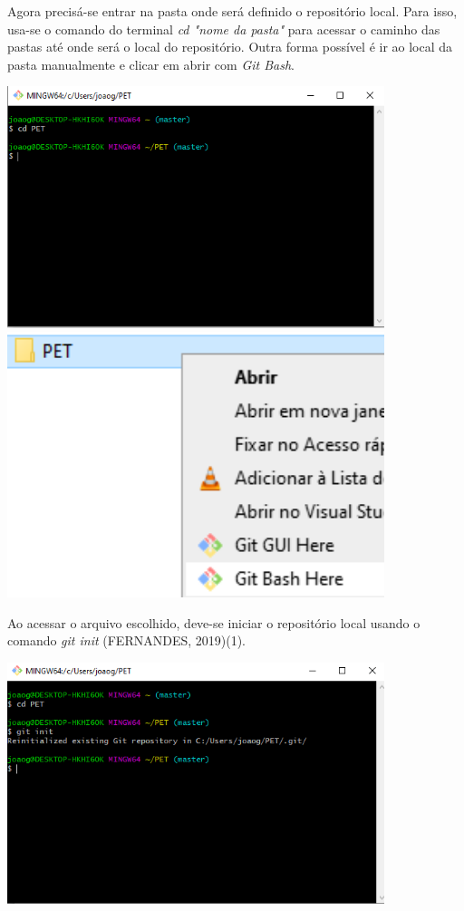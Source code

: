 \documentclass{article}
\begin{document}
Agora precisá-se entrar na pasta onde será definido o repositório local. Para isso, usa-se o comando do terminal \textit{cd "nome da pasta"} para acessar o caminho das pastas até onde será o local do repositório. Outra forma possível é ir ao local da pasta manualmente e clicar em abrir com \textit{Git Bash}.

\includegraphics[width = 11cm]{images/cd.png}\\
\includegraphics[width = 11cm]{images/abrirComBash.png}

Ao acessar o arquivo escolhido, deve-se iniciar o repositório local usando o comando \textit{git init} (FERNANDES, 2019)(1).

\includegraphics[width = 11cm]{images/gitInit.png}
\end{document}
